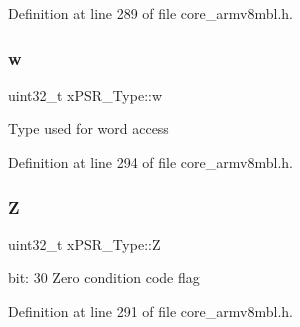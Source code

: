 Definition at line 289 of file core\+\_\+armv8mbl.\+h.

\mbox{\label{unionx_p_s_r___type_a1a47176768f45f79076c4f5b1b534bc2}} 
\subsubsection{\texorpdfstring{w}{w}}
{\footnotesize\ttfamily uint32\+\_\+t x\+P\+S\+R\+\_\+\+Type\+::w}

Type used for word access 

Definition at line 294 of file core\+\_\+armv8mbl.\+h.

\mbox{\label{unionx_p_s_r___type_a1e5d9801013d5146f2e02d9b7b3da562}} 
\subsubsection{\texorpdfstring{Z}{Z}}
{\footnotesize\ttfamily uint32\+\_\+t x\+P\+S\+R\+\_\+\+Type\+::Z}

bit\+: 30 Zero condition code flag 

Definition at line 291 of file core\+\_\+armv8mbl.\+h.



